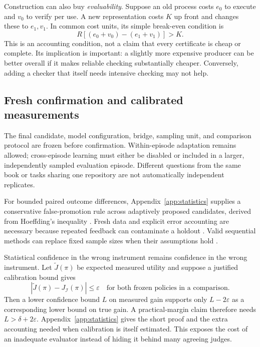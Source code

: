 \documentclass[11pt,letterpaper]{article}
\newcommand{\I}{\mathcal I}
\theoremstyle{remark}\newtheorem{remark}{Remark}[section]
\begin{document}
Construction can also buy \emph{evaluability}. Suppose an old process costs $e_0$ to execute and $v_0$ to verify per use. A new representation costs $K$ up front and changes these to $e_1,v_1$. In common cost units, its simple break-even condition is
\begin{equation}
R[(e_0+v_0)-(e_1+v_1)]>K.\label{eq:verification-economics}
\end{equation}
This is an accounting condition, not a claim that every certificate is cheap or complete. Its implication is important: a slightly more expensive producer can be better overall if it makes reliable checking substantially cheaper. Conversely, adding a checker that itself needs intensive checking may not help.

\subsection{Fresh confirmation and calibrated measurements}
The final candidate, model configuration, bridge, sampling unit, and comparison protocol are frozen before confirmation. Within-episode adaptation remains allowed; cross-episode learning must either be disabled or included in a larger, independently sampled evaluation episode. Different questions from the same book or tasks sharing one repository are not automatically independent replicates.

For bounded paired outcome differences, Appendix~\ref{app:statistics} supplies a conservative false-promotion rule across adaptively proposed candidates, derived from Hoeffding's inequality \citep{hoeffding1963inequalities}. Fresh data and explicit error accounting are necessary because repeated feedback can contaminate a holdout \citep{dwork2014adaptive}. Valid sequential methods can replace fixed sample sizes when their assumptions hold \citep{howard2021confidence}.

Statistical confidence in the wrong instrument remains confidence in the wrong instrument. Let $\widetilde J(\pi)$ be expected measured utility and suppose a justified calibration bound gives
\begin{equation}
|\widetilde J(\pi)-J_\I(\pi)|\leq\varepsilon
\quad\text{for both frozen policies in a comparison}.\label{eq:calibration}
\end{equation}
Then a lower confidence bound $L$ on measured gain supports only $L-2\varepsilon$ as a corresponding lower bound on true gain. A practical-margin claim therefore needs $L>\delta+2\varepsilon$. Appendix~\ref{app:statistics} gives the short proof and the extra accounting needed when calibration is itself estimated. This exposes the cost of an inadequate evaluator instead of hiding it behind many agreeing judges.
\end{document}
